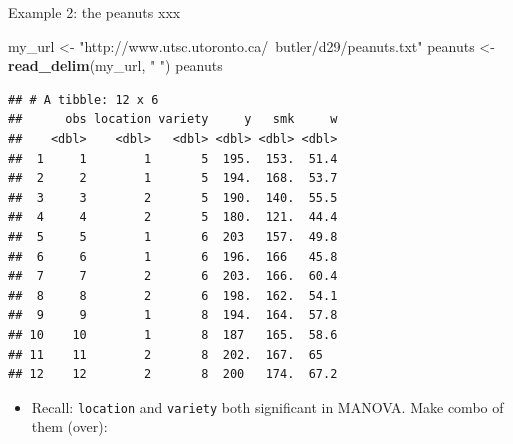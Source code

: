 \documentclass[ignorenonframetext,]{beamer}
\newenvironment{Shaded}{\begin{snugshade}}{\end{snugshade}}
\newcommand{\KeywordTok}[1]{\textcolor[rgb]{0.13,0.29,0.53}{\textbf{#1}}}
\newcommand{\NormalTok}[1]{#1}
\newcommand{\StringTok}[1]{\textcolor[rgb]{0.31,0.60,0.02}{#1}}
\providecommand{\tightlist}{%
  \setlength{\itemsep}{0pt}\setlength{\parskip}{0pt}}
\begin{document}
\begin{frame}[fragile]{Example 2: the peanuts xxx}
\protect\hypertarget{example-2-the-peanuts-xxx}{}

\scriptsize

\begin{Shaded}
\begin{Highlighting}[]
\NormalTok{my_url <-}\StringTok{ "http://www.utsc.utoronto.ca/~butler/d29/peanuts.txt"}
\NormalTok{peanuts <-}\StringTok{ }\KeywordTok{read_delim}\NormalTok{(my_url, }\StringTok{" "}\NormalTok{)}
\NormalTok{peanuts}
\end{Highlighting}
\end{Shaded}

\begin{verbatim}
## # A tibble: 12 x 6
##      obs location variety     y   smk     w
##    <dbl>    <dbl>   <dbl> <dbl> <dbl> <dbl>
##  1     1        1       5  195.  153.  51.4
##  2     2        1       5  194.  168.  53.7
##  3     3        2       5  190.  140.  55.5
##  4     4        2       5  180.  121.  44.4
##  5     5        1       6  203   157.  49.8
##  6     6        1       6  196.  166   45.8
##  7     7        2       6  203.  166.  60.4
##  8     8        2       6  198.  162.  54.1
##  9     9        1       8  194.  164.  57.8
## 10    10        1       8  187   165.  58.6
## 11    11        2       8  202.  167.  65  
## 12    12        2       8  200   174.  67.2
\end{verbatim}

\normalsize

\begin{itemize}
\tightlist
\item
  Recall: \texttt{location} and \texttt{variety} both significant in
  MANOVA. Make combo of them (over):
\end{itemize}

\end{frame}
\end{document}
